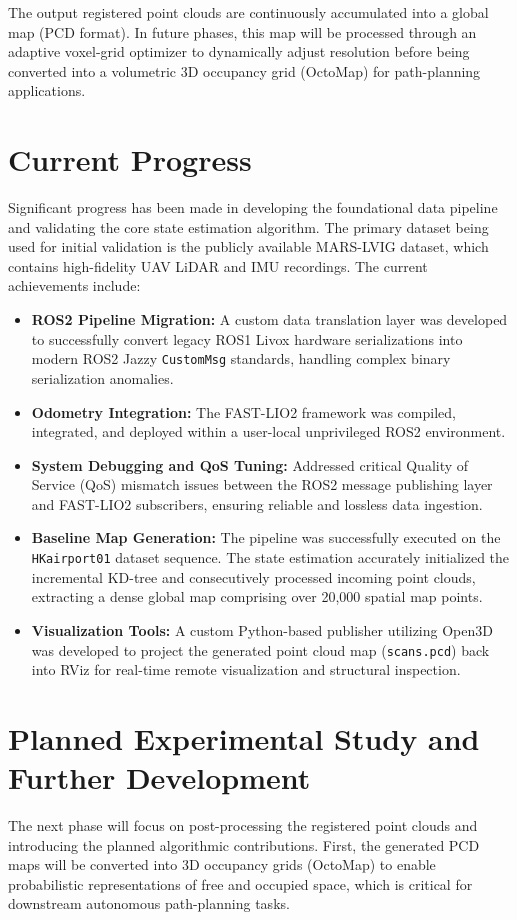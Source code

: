 \documentclass[11pt,a4paper]{article}
\begin{document}
The output registered point clouds are continuously accumulated into a global map (PCD format). In future phases, this map will be processed through an adaptive voxel-grid optimizer to dynamically adjust resolution before being converted into a volumetric 3D occupancy grid (OctoMap) for path-planning applications.

\section*{Current Progress}
Significant progress has been made in developing the foundational data pipeline and validating the core state estimation algorithm. The primary dataset being used for initial validation is the publicly available MARS-LVIG dataset, which contains high-fidelity UAV LiDAR and IMU recordings.
The current achievements include:
\begin{itemize}
    \item \textbf{ROS2 Pipeline Migration:} A custom data translation layer was developed to successfully convert legacy ROS1 Livox hardware serializations into modern ROS2 Jazzy \texttt{CustomMsg} standards, handling complex binary serialization anomalies.
    \item \textbf{Odometry Integration:} The FAST-LIO2 framework was compiled, integrated, and deployed within a user-local unprivileged ROS2 environment.
    \item \textbf{System Debugging and QoS Tuning:} Addressed critical Quality of Service (QoS) mismatch issues between the ROS2 message publishing layer and FAST-LIO2 subscribers, ensuring reliable and lossless data ingestion.
    \item \textbf{Baseline Map Generation:} The pipeline was successfully executed on the \texttt{HKairport01} dataset sequence. The state estimation accurately initialized the incremental KD-tree and consecutively processed incoming point clouds, extracting a dense global map comprising over 20,000 spatial map points.
    \item \textbf{Visualization Tools:} A custom Python-based publisher utilizing Open3D was developed to project the generated point cloud map (\texttt{scans.pcd}) back into RViz for real-time remote visualization and structural inspection.
\end{itemize}

\section*{Planned Experimental Study and Further Development}
The next phase will focus on post-processing the registered point clouds and introducing the planned algorithmic contributions. 
First, the generated PCD maps will be converted into 3D occupancy grids (OctoMap) to enable probabilistic representations of free and occupied space, which is critical for downstream autonomous path-planning tasks.
\end{document}
